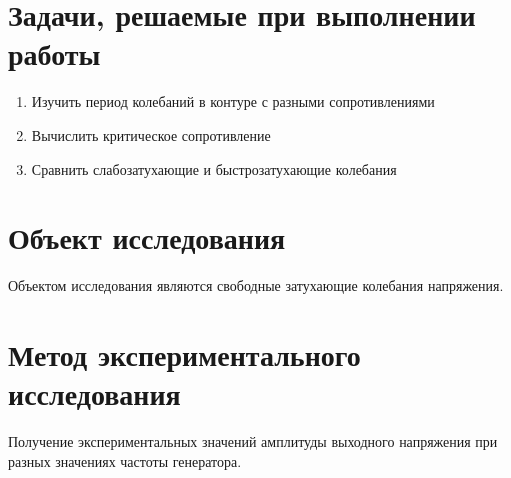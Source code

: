 \documentclass[14pt]{extarticle}
\begin{document}
    \section{Задачи, решаемые при выполнении работы}
    \begin{enumerate}
        \item Изучить период колебаний в контуре с разными сопротивлениями
        \item Вычислить критическое сопротивление
        \item Сравнить слабозатухающие и быстрозатухающие колебания
    \end{enumerate}
    
    \section{Объект исследования}
    Объектом исследования являются свободные затухающие колебания напряжения.

    \section{Метод экспериментального исследования}
    Получение экспериментальных значений амплитуды выходного напряжения при разных значениях частоты генератора.
    
\end{document}
